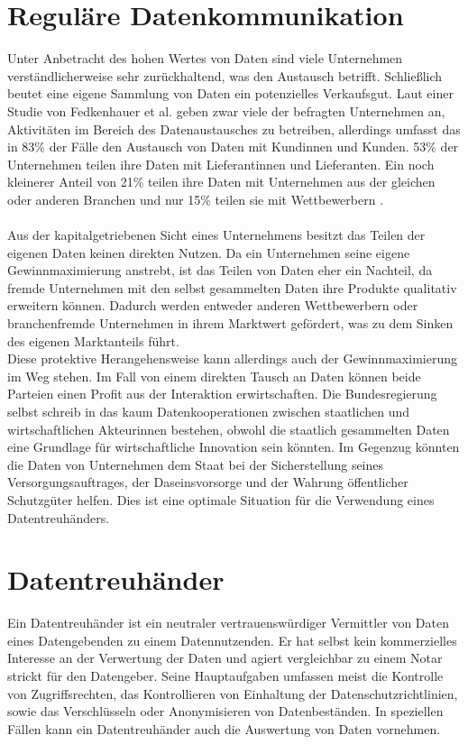 \documentclass{scrreprt}
\begin{document}
\section{Reguläre Datenkommunikation}
Unter Anbetracht des hohen Wertes von Daten sind viele Unternehmen verständlicherweise sehr zurückhaltend, was den Austausch betrifft. Schließlich beutet eine eigene Sammlung von Daten ein potenzielles Verkaufsgut. Laut einer  Studie von Fedkenhauer et al. geben zwar viele der befragten Unternehmen an, Aktivitäten im Bereich des Datenaustausches zu betreiben, allerdings umfasst das in 83\% der Fälle den Austausch von Daten mit Kundinnen und Kunden. 53\% der Unternehmen teilen ihre Daten mit Lieferantinnen und Lieferanten. Ein noch kleinerer Anteil von 21\% teilen ihre Daten mit Unternehmen aus der gleichen oder anderen Branchen und nur 15\% teilen sie mit Wettbewerbern \cite{dt-fedkenhauer2017datenaustausch}. \\\\
Aus der kapitalgetriebenen Sicht eines Unternehmens besitzt das Teilen der eigenen Daten keinen direkten Nutzen. Da ein Unternehmen seine eigene Gewinnmaximierung anstrebt, ist das Teilen von Daten eher ein Nachteil, da fremde Unternehmen mit den selbst gesammelten Daten ihre Produkte qualitativ erweitern können. Dadurch werden entweder anderen Wettbewerbern oder branchenfremde Unternehmen in ihrem Marktwert gefördert, was zu dem Sinken des eigenen Marktanteils führt. \\
Diese protektive Herangehensweise kann allerdings auch der Gewinnmaximierung im Weg stehen. Im Fall von einem direkten Tausch an Daten können beide Parteien einen Profit aus der Interaktion erwirtschaften. Die Bundesregierung selbst schreib in \cite{dt-bundesregierung2021datenstrategie} das kaum Datenkooperationen zwischen staatlichen und wirtschaftlichen Akteurinnen bestehen, obwohl die staatlich gesammelten Daten eine Grundlage für wirtschaftliche Innovation sein könnten. Im Gegenzug könnten die Daten von Unternehmen dem Staat bei der Sicherstellung seines Versorgungsauftrages, der Daseinsvorsorge und der Wahrung öffentlicher Schutzgüter helfen. Dies ist eine optimale Situation für die Verwendung eines Datentreuhänders.
\section{Datentreuhänder}
\label{sec:dt}
Ein Datentreuhänder ist ein neutraler vertrauenswürdiger Vermittler von Daten eines Datengebenden zu einem Datennutzenden. Er hat selbst kein kommerzielles Interesse an der Verwertung der Daten und agiert vergleichbar zu einem Notar strickt für den Datengeber. Seine Hauptaufgaben umfassen meist die Kontrolle von Zugriffsrechten, das Kontrollieren von Einhaltung der Datenschutzrichtlinien, sowie das Verschlüsseln oder Anonymisieren von Datenbeständen. In speziellen Fällen kann ein Datentreuhänder auch die Auswertung von Daten vornehmen. \cite{dt-bundesregierung2021datenstrategie}\cite{dt-richter2020ddvtalk}
\end{document}
